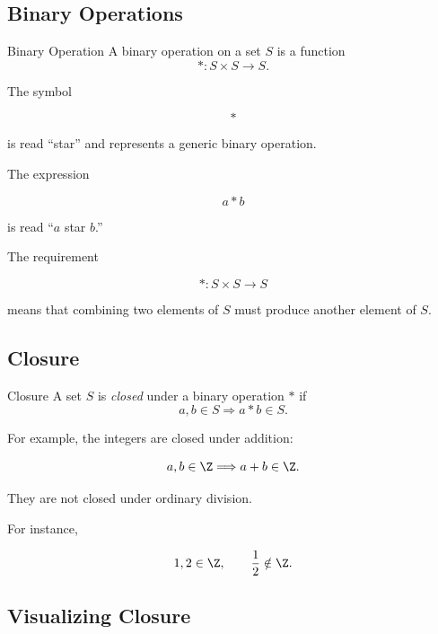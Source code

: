\subsection{Binary Operations}
\label{subsec:binary-operations}

\begin{definitionbox}{Binary Operation}
A binary operation on a set \(S\) is a function
\[ *:S\times S\to S. \]
\end{definitionbox}

The symbol

\[ * \]

is read ``star'' and represents a generic binary operation.

The expression

\[ a*b \]

is read ``\(a\) star \(b\).''

The requirement

\[ *:S\times S\to S \]

means that combining two elements of \(S\) must produce another element of
\(S\).

\subsection{Closure}
\label{subsec:closure-abstract-algebra}

\begin{definitionbox}{Closure}
A set \(S\) is \emph{closed} under a binary operation \(*\) if
\[ a,b\in S\Longrightarrow a*b\in S. \]
\end{definitionbox}

For example, the integers are closed under addition:

\[ a,b\in\Z\Longrightarrow a+b\in\Z. \]

They are not closed under ordinary division.

For instance,

\[ 1,2\in\Z,\qquad \frac12\notin\Z. \]

\subsection{Visualizing Closure}
\label{subsec:visual-closure}


